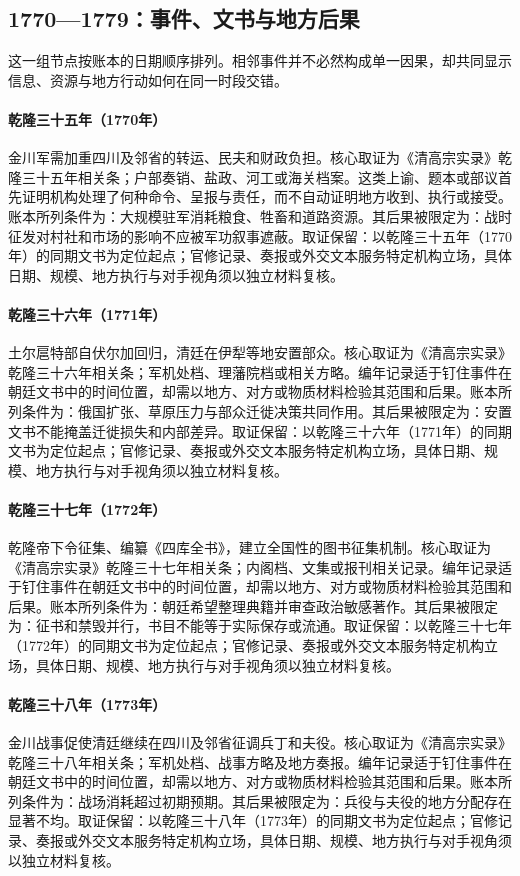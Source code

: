 \subsection{1770—1779：事件、文书与地方后果}
这一组节点按账本的日期顺序排列。相邻事件并不必然构成单一因果，却共同显示信息、资源与地方行动如何在同一时段交错。
\hypertarget{ledger:EQ-1770-SICHUAN-SUPPLY-BURDEN}{}\paragraph{乾隆三十五年（1770年）}金川军需加重四川及邻省的转运、民夫和财政负担。核心取证为《清高宗实录》乾隆三十五年相关条；户部奏销、盐政、河工或海关档案。这类上谕、题本或部议首先证明机构处理了何种命令、呈报与责任，而不自动证明地方收到、执行或接受。账本所列条件为：大规模驻军消耗粮食、牲畜和道路资源。其后果被限定为：战时征发对村社和市场的影响不应被军功叙事遮蔽。取证保留：以乾隆三十五年（1770年）的同期文书为定位起点；官修记录、奏报或外交文本服务特定机构立场，具体日期、规模、地方执行与对手视角须以独立材料复核。
\hypertarget{ledger:EQ-1771-TORGHUT-RETURN}{}\paragraph{乾隆三十六年（1771年）}土尔扈特部自伏尔加回归，清廷在伊犁等地安置部众。核心取证为《清高宗实录》乾隆三十六年相关条；军机处档、理藩院档或相关方略。编年记录适于钉住事件在朝廷文书中的时间位置，却需以地方、对方或物质材料检验其范围和后果。账本所列条件为：俄国扩张、草原压力与部众迁徙决策共同作用。其后果被限定为：安置文书不能掩盖迁徙损失和内部差异。取证保留：以乾隆三十六年（1771年）的同期文书为定位起点；官修记录、奏报或外交文本服务特定机构立场，具体日期、规模、地方执行与对手视角须以独立材料复核。
\hypertarget{ledger:EQ-1772-SIKU-QUANSHU-ORDER}{}\paragraph{乾隆三十七年（1772年）}乾隆帝下令征集、编纂《四库全书》，建立全国性的图书征集机制。核心取证为《清高宗实录》乾隆三十七年相关条；内阁档、文集或报刊相关记录。编年记录适于钉住事件在朝廷文书中的时间位置，却需以地方、对方或物质材料检验其范围和后果。账本所列条件为：朝廷希望整理典籍并审查政治敏感著作。其后果被限定为：征书和禁毁并行，书目不能等于实际保存或流通。取证保留：以乾隆三十七年（1772年）的同期文书为定位起点；官修记录、奏报或外交文本服务特定机构立场，具体日期、规模、地方执行与对手视角须以独立材料复核。
\hypertarget{ledger:EQ-1773-SICHUAN-RECRUITMENT}{}\paragraph{乾隆三十八年（1773年）}金川战事促使清廷继续在四川及邻省征调兵丁和夫役。核心取证为《清高宗实录》乾隆三十八年相关条；军机处档、战事方略及地方奏报。编年记录适于钉住事件在朝廷文书中的时间位置，却需以地方、对方或物质材料检验其范围和后果。账本所列条件为：战场消耗超过初期预期。其后果被限定为：兵役与夫役的地方分配存在显著不均。取证保留：以乾隆三十八年（1773年）的同期文书为定位起点；官修记录、奏报或外交文本服务特定机构立场，具体日期、规模、地方执行与对手视角须以独立材料复核。
